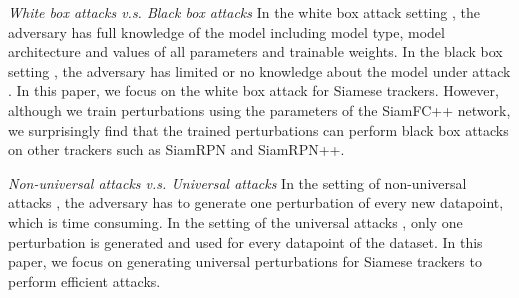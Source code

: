 \documentclass[journal]{IEEEtran}
\begin{document}
\textit{White box attacks v.s. Black box attacks} In the white box attack setting \cite{meng2019white}, the adversary has full knowledge of the model including model type, model architecture and values of all parameters and trainable weights. In the black box setting \cite{cheng2018query,li2019nattack,papernot2017practical,li2020projection}, the adversary has limited or no knowledge about the model under attack \cite{kurakin2018adversarial}. In this paper, we focus on the white box attack for Siamese trackers. However, although we train perturbations using the parameters of the SiamFC++ network, we surprisingly find that the trained perturbations can perform black box attacks on other trackers such as SiamRPN and SiamRPN++.

\textit{Non-universal attacks v.s. Universal attacks} In the setting of non-universal attacks \cite{dai2018adversarial,li2018second,lin2017tactics}, the adversary has to generate one perturbation of every new datapoint, which is time consuming. In the setting of the universal attacks \cite{khrulkov2018art,mopuri2018nag,zhang2020understanding,mopuri2018generalizable,chen2018shapeshifter}, only one perturbation is generated and used for every datapoint of the dataset. In this paper, we focus on generating universal perturbations for Siamese trackers to perform efficient attacks.

\end{document}
